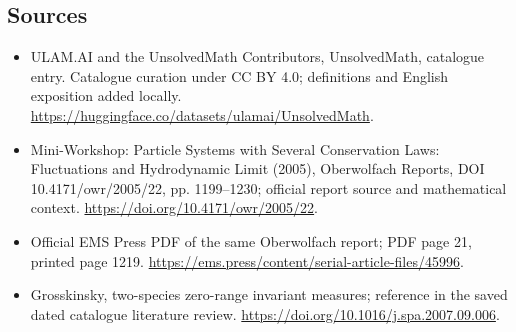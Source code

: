 \documentclass[11pt]{article}
\begin{document}
\subsection{Sources}
\begin{itemize}
\item[\hypertarget{source:statement:1}{S1}] ULAM.AI and the UnsolvedMath Contributors, UnsolvedMath, catalogue entry. Catalogue curation under CC BY 4.0; definitions and English exposition added locally.
\url{https://huggingface.co/datasets/ulamai/UnsolvedMath}.
\item[\hypertarget{source:statement:2}{S2}] Mini-Workshop: Particle Systems with Several Conservation Laws: Fluctuations and Hydrodynamic Limit (2005), Oberwolfach Reports, DOI 10.4171/owr/2005/22, pp. 1199--1230; official report source and mathematical context.
\url{https://doi.org/10.4171/owr/2005/22}.
\item[\hypertarget{source:statement:3}{S3}] Official EMS Press PDF of the same Oberwolfach report; PDF page 21, printed page 1219.
\url{https://ems.press/content/serial-article-files/45996}.
\item[\hypertarget{source:statement:4}{S4}] Grosskinsky, two-species zero-range invariant measures; reference in the saved dated catalogue literature review.
\url{https://doi.org/10.1016/j.spa.2007.09.006}.
\end{itemize}
\label{end:statement}
\end{document}
